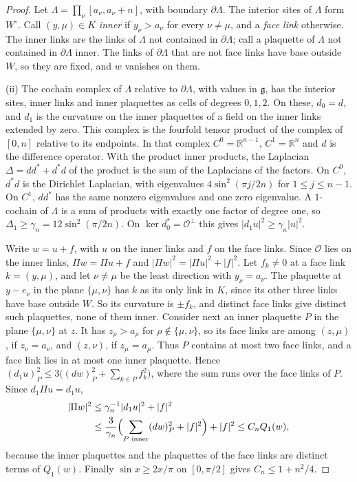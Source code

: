 \documentclass[11pt]{amsart}
\theoremstyle{definition}
\theoremstyle{remark}
\numberwithin{equation}{section}
\newcommand{\R}{\mathbb{R}}
\newcommand{\g}{\mathfrak{g}}
\begin{document}
\begin{proof}
Let $\Lambda=\prod_\nu[a_\nu,a_\nu+n]$, with boundary $\partial\Lambda$.
The interior sites of $\Lambda$ form $W^\circ$. Call $(y,\mu)\in K$
\emph{inner} if $y_\nu>a_\nu$ for every $\nu\ne\mu$, and a \emph{face link}
otherwise. The inner links are the links of $\Lambda$ not contained in
$\partial\Lambda$; call a plaquette of $\Lambda$ not contained in $\partial
\Lambda$ inner. The links of $\partial\Lambda$ that are not face links have
base outside $W$, so they are fixed, and $w$ vanishes on them.

(ii) The cochain complex of $\Lambda$ relative to $\partial\Lambda$, with
values in $\g$, has the interior sites, inner links and inner plaquettes as
cells of degrees $0,1,2$. On these, $d_0=d$, and $d_1$ is the curvature on
the inner plaquettes of a field on the inner links extended by zero. This
complex is the fourfold tensor product of the complex of $[0,n]$ relative
to its endpoints. In that complex $C^0=\R^{n-1}$, $C^1=\R^n$ and $d$ is the
difference operator. With the product inner products, the Laplacian $\Delta
=dd^*+d^*d$ of the product is the sum of the Laplacians of the factors. On
$C^0$, $d^*d$ is the Dirichlet Laplacian, with eigenvalues $4\sin^2(\pi j/
2n)$ for $1\le j\le n-1$. On $C^1$, $dd^*$ has the same nonzero eigenvalues
and one zero eigenvalue. A $1$-cochain of $\Lambda$ is a sum of products
with exactly one factor of degree one, so $\Delta_1\ge\gamma_n=12\sin^2(\pi
/2n)$. On $\ker d_0^*=\mathcal O^\perp$ this gives $\lvert d_1u\rvert^2\ge
\gamma_n|u|^2$.

Write $w=u+f$, with $u$ on the inner links and $f$ on the face links. Since
$\mathcal O$ lies on the inner links, $\Pi w=\Pi u+f$ and $|\Pi w|^2=|\Pi
u|^2+|f|^2$. Let $f_k\ne0$ at a face link $k=(y,\mu)$, and let $\nu\ne\mu$
be the least direction with $y_\nu=a_\nu$. The plaquette at $y-e_\nu$ in
the plane $\{\mu,\nu\}$ has $k$ as its only link in $K$, since its other
three links have base outside $W$. So its curvature is $\pm f_k$, and
distinct face links give distinct such plaquettes, none of them inner.
Consider next an inner plaquette $P$ in the plane $\{\mu,\nu\}$ at $z$.
It has $z_\rho>a_\rho$ for $\rho\notin\{\mu,\nu\}$, so its face links are
among $(z,\mu)$, if $z_\nu=a_\nu$, and $(z,\nu)$, if $z_\mu=a_\mu$. Thus
$P$ contains at most two face links, and a face link lies in at most one
inner plaquette. Hence $(d_1u)_P^2\le3\bigl((dw)_P^2+\sum_{k\in P}f_k^2
\bigr)$, where the sum runs over the face links of $P$. Since $d_1\Pi u=
d_1u$,
\[
\begin{split}
|\Pi w|^2&\le\gamma_n^{-1}\lvert d_1u\rvert^2+|f|^2\\
&\le\frac3{\gamma_n}\Bigl(\sum_{P\text{ inner}}(dw)_P^2+|f|^2\Bigr)+|f|^2
\le C_nQ_1(w),
\end{split}
\]
because the inner plaquettes and the plaquettes of the face links are
distinct terms of $Q_1(w)$. Finally $\sin x\ge2x/\pi$ on $[0,\pi/2]$ gives
$C_n\le1+n^2/4$.


\end{proof}
\end{document}
